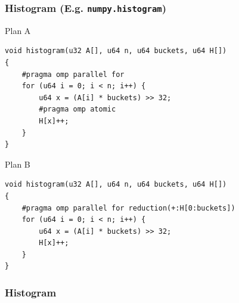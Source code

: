 \documentclass[xcolor={x11names,svgnames},x11names,svgnames]{beamer}
\begin{document}
\begin{frame}[fragile=singleslide]
  \frametitle{Histogram (E.g. \texttt{numpy.histogram})}


  \begin{block}{Plan A}
    \vspace*{-1ex}
\begin{verbatim}
void histogram(u32 A[], u64 n, u64 buckets, u64 H[])
{
    #pragma omp parallel for
    for (u64 i = 0; i < n; i++) {
        u64 x = (A[i] * buckets) >> 32;
        #pragma omp atomic
        H[x]++;
    }
}
\end{verbatim}
  \end{block}

    \begin{block}{Plan B}
    \vspace*{-1ex}
\begin{verbatim}
void histogram(u32 A[], u64 n, u64 buckets, u64 H[])
{
    #pragma omp parallel for reduction(+:H[0:buckets])
    for (u64 i = 0; i < n; i++) {
        u64 x = (A[i] * buckets) >> 32;
        H[x]++;
    }
}
\end{verbatim}
  \end{block}

\end{frame}


\begin{frame}[label=histogram_curve]
  \frametitle{Histogram}

\end{frame}
\end{document}
